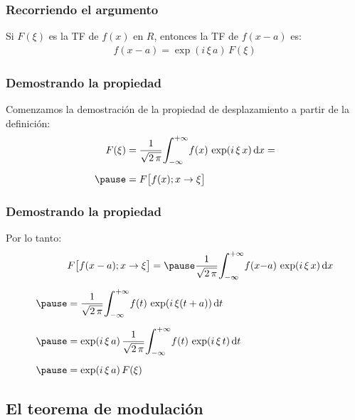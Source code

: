 \begin{frame}
\frametitle{Recorriendo el argumento}
Si $F (\xi)$ es la TF de $f (x)$ en $R$, entonces la TF de $f (x - a)$ es:
\pause
\begin{align*}
f (x - a) = \exp(i \, \xi \, a) \, F (\xi)
\end{align*}
\end{frame}
\begin{frame}
\frametitle{Demostrando la propiedad}
Comenzamos la demostración de la propiedad de desplazamiento a partir de la definición:
\pause
\begin{eqnarray*}
\begin{aligned}
F (\xi) &= \dfrac{1}{\sqrt{2 \, \pi}} \scaleint{6ex}_{\bs -\infty}^{+\infty} f (x) \, \exp(i \, \xi \, x) \dd{x} = \\[0.5em] \pause
&= F \big[ f (x); x \to \xi \big]
\end{aligned}
\end{eqnarray*}
\end{frame}
\begin{frame}
\frametitle{Demostrando la propiedad}
Por lo tanto:
\pause
\begin{eqnarray*}
\begin{aligned}
&F \big[ f (x - a); x \to \xi \big] =  \pause \dfrac{1}{\sqrt{2 \, \pi}} \scaleint{6ex}_{\bs -\infty}^{+\infty} f (x {-} a) \, \exp(i \, \xi \, x) \dd{x} \\[0.5em] \pause 
&= \dfrac{1}{\sqrt{2 \, \pi}} \scaleint{6ex}_{\bs -\infty}^{+\infty} f (t) \, \exp(i \, \xi (t + a)) \dd{t} \\[0.5em] \pause 
&= \exp(i \, \xi \, a) \, \dfrac{1}{\sqrt{2 \, \pi}} \scaleint{6ex}_{\bs -\infty}^{+\infty} f (t) \, \exp(i \, \xi \, t) \dd{t} \\[0.5em] \pause 
&= \exp(i \, \xi \, a) \, F (\xi) 
\end{aligned}
\end{eqnarray*}
\end{frame}

\subsection{El teorema de modulación}


